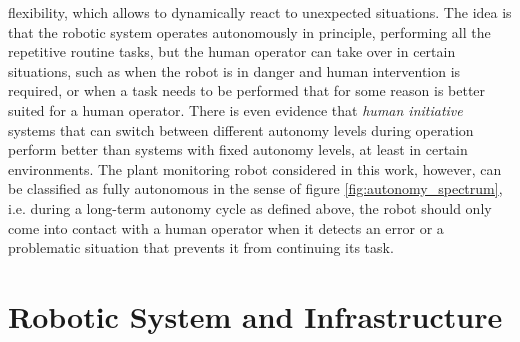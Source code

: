 \documentclass[english, master, utf8]{base/thesis_KBS}
\begin{document}
flexibility, which allows to dynamically react to unexpected situations. \cite{Bresina:2005}
The idea is that the robotic system operates autonomously in principle, performing all the repetitive routine tasks, but the human operator can take over in certain situations,
such as when the robot is in danger and human intervention is required, or when a task needs to be performed that for some reason is better suited for a human operator.
\cite{Kortenkamp:2009} There is even evidence that \textit{human initiative} systems that can switch between different autonomy levels during operation perform better than
systems with fixed autonomy levels, at least in certain environments. \cite{Chiou:2021}
The plant monitoring robot considered in this work, however, can be classified as fully autonomous in the sense of figure \ref{fig:autonomy_spectrum}, 
i.e. during a long-term autonomy cycle as defined above, the robot should only come into contact with a human operator when it detects an error or a problematic situation
that prevents it from continuing its task.

\section{Robotic System and Infrastructure}
\label{sec:robotic_system}
\end{document}
